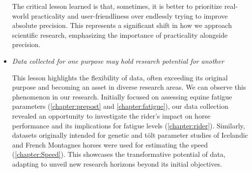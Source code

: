 \begin{itemize}[label={$\bullet$}, leftmargin=*]
The critical lesson learned is that, sometimes, it is better to prioritize real-world practicality and user-friendliness over endlessly trying to improve absolute precision. This represents a significant shift in how we approach scientific research, emphasizing the importance of practicality alongside precision.

\item{\textit{Data collected for one purpose may hold research potential for another}}

This lesson highlights the flexibility of data, often exceeding its original purpose and becoming an asset in diverse research areas. We can observe this phenomenon in our research. Initially focused on assessing equine fatigue parameters (\ref{chapter:prepost} and \ref{chapter:fatigue}), our data collection revealed an opportunity to investigate the rider's impact on horse performance and its implications for fatigue levels (\ref{chapter:rider}). Similarly, datasets originally intended for genetic and t\"{o}lt parameter studies of Icelandic and French Montagnes horses were used for estimating the speed (\ref{chapter:Speed}). This showcases the transformative potential of data, adapting to unveil new research horizons beyond its initial objectives.

\end{itemize}





